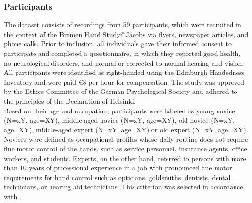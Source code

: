 \subsubsection{Participants}
The dataset consists of recordings from 59 participants, which were recruited in the context of the Bremen Hand Study@Jacobs via flyers, newspaper articles, and phone calls. Prior to inclusion, all individuals gave their informed consent to participate and completed a questionnaire, in which they reported good health, no neurological disorders, and normal or corrected-to-normal hearing and vision. All participants were identified as right-handed using the Edinburgh Handedness Inventory \cite{Oldfield1971} and were paid \euro{8} per hour for compensation. The study was approved by the Ethics Committee of the German Psychological Society and adhered to the principles of the Declaration of Helsinki.\\
Based on their age and occupation, participants were labeled as young novice (N=xY, age=XY), middle-aged novice (N=xY, age=XY), old novice (N=xY, age=XY), middle-aged expert (N=xY, age=XY) or old expert (N=xY, age=XY). Novices were defined as occupational profiles whose daily routine does not require fine motor control of the hands, such as service personnel, insurance agents, office workers, and students. Experts, on the other hand, referred to persons with more than 10 years of professional experience in a job with pronounced fine motor requirements for hand control such as opticians, goldsmiths, dentists, dental technicians, or hearing aid technicians. This criterion was selected in accordance with \cite{Ericsson1991}. 

